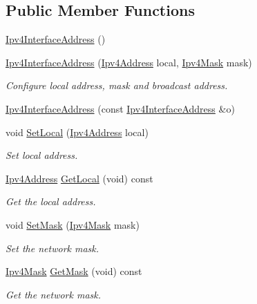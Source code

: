 \subsection*{Public Member Functions}
\begin{DoxyCompactItemize}
\item 
\hyperlink{classns3_1_1Ipv4InterfaceAddress_aa8121ffa831c5daa29acbd8cffca1bd2}{Ipv4\+Interface\+Address} ()
\item 
\hyperlink{classns3_1_1Ipv4InterfaceAddress_a31f0e2fb45ff5c76ab5ac20f334a3827}{Ipv4\+Interface\+Address} (\hyperlink{classns3_1_1Ipv4Address}{Ipv4\+Address} local, \hyperlink{classns3_1_1Ipv4Mask}{Ipv4\+Mask} mask)
\begin{DoxyCompactList}\small\item\em Configure local address, mask and broadcast address. \end{DoxyCompactList}\item 
\hyperlink{classns3_1_1Ipv4InterfaceAddress_acd23b0cee529ac0cc676b640028a04a6}{Ipv4\+Interface\+Address} (const \hyperlink{classns3_1_1Ipv4InterfaceAddress}{Ipv4\+Interface\+Address} \&o)
\item 
void \hyperlink{classns3_1_1Ipv4InterfaceAddress_a59a18991fcef5234116fbfcc6a3bfcaf}{Set\+Local} (\hyperlink{classns3_1_1Ipv4Address}{Ipv4\+Address} local)
\begin{DoxyCompactList}\small\item\em Set local address. \end{DoxyCompactList}\item 
\hyperlink{classns3_1_1Ipv4Address}{Ipv4\+Address} \hyperlink{classns3_1_1Ipv4InterfaceAddress_a716a425049f48b9fe6e38868b1f413f6}{Get\+Local} (void) const 
\begin{DoxyCompactList}\small\item\em Get the local address. \end{DoxyCompactList}\item 
void \hyperlink{classns3_1_1Ipv4InterfaceAddress_a0c1d6245b3357cc33acd594b09578c6e}{Set\+Mask} (\hyperlink{classns3_1_1Ipv4Mask}{Ipv4\+Mask} mask)
\begin{DoxyCompactList}\small\item\em Set the network mask. \end{DoxyCompactList}\item 
\hyperlink{classns3_1_1Ipv4Mask}{Ipv4\+Mask} \hyperlink{classns3_1_1Ipv4InterfaceAddress_a6b854be0dc6cd68dacaea8b8037cbc62}{Get\+Mask} (void) const 
\begin{DoxyCompactList}\small\item\em Get the network mask. \end{DoxyCompactList}\item 

\end{DoxyCompactItemize}
